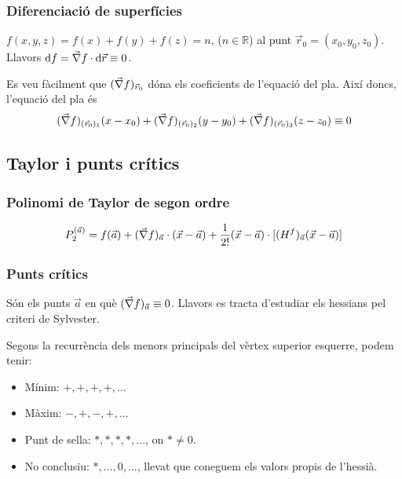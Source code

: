 \subsubsection*{Diferenciació de superfícies}
$f(x,y,z) = f(x) + f(y) + f(z) = n$, ($n \in \mathbb{R}$) al punt $\vec{r}_{0} = (x_{0}, y_{0}, z_{0})$. Llavors $\mathrm{d} f = \vec{\nabla} f \cdot \mathrm{d} \vec{r} \equiv 0$.

Es veu fàcilment que $(\vec{\nabla} f)_{\vec{r}_{0}}$ dóna els coeficients de l'equació del pla. Així doncs, l'equació del pla és
\begin{align}
    (\vec{\nabla} f)_{(\vec{r}_{0})_{1}} (x - x_{0}) + (\vec{\nabla} f)_{(\vec{r}_{0})_{2}} (y - y_{0}) + (\vec{\nabla} f)_{(\vec{r}_{0})_{3}} (z - z_{0}) \equiv 0
\end{align}

\subsection*{Taylor i punts crítics}
\subsubsection*{Polinomi de Taylor de segon ordre}
\begin{align}
    P_{2}^{(\vec{a})} = f(\vec{a}) + (\vec{\nabla} f)_{\vec{a}} \cdot (\vec{x} - \vec{a}) + \frac{1}{2!} (\vec{x} - \vec{a}) \cdot [(H^{f})_{\vec{a}} (\vec{x} - \vec{a})]
\end{align}

\subsubsection*{Punts crítics}
Són els punts $\vec{a}$ en què $(\vec{\nabla} f)_{\vec{a}} \equiv 0$. Llavors es tracta d'estudiar els hessians pel criteri de Sylvester. 

Segons la recurrència dels menors principals del vèrtex superior esquerre, podem tenir:
\begin{itemize}
    \item Mínim: $+, +, +, +, \dots$
    \item Màxim: $-, +, -, +, \dots$
    \item Punt de sella: $*, *, *, *, \dots$, on $* \neq 0$.
    \item No conclusiu: $*, \dots , 0, \dots$, llevat que coneguem els valors propis de l'hessià.
\end{itemize}

